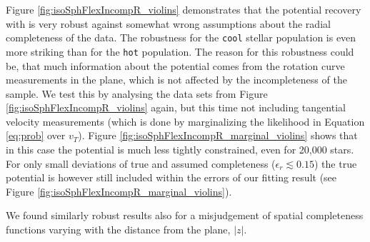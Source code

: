 Figure \ref{fig:isoSphFlexIncompR_violins} demonstrates that the potential recovery with \RM{} is very robust against somewhat wrong assumptions about the radial completeness of the data. The robustness for the \texttt{cool} stellar population is even more striking than for the \texttt{hot} population. The reason for this robustness could be, that much information about the potential comes from the rotation curve measurements in the plane, which is not affected by the incompleteness of the sample. We test this by analysing the data sets from Figure \ref{fig:isoSphFlexIncompR_violins} again, but this time not including tangential velocity measurements (which is done by marginalizing the likelihood in Equation \ref{eq:prob} over $v_T$). Figure \ref{fig:isoSphFlexIncompR_marginal_violins} shows that in this case the potential is much less tightly constrained, even for 20,000 stars. For only small deviations of true and assumed completeness ($\epsilon_r \lesssim 0.15$) the true potential is however still included within the errors of our fitting result (see Figure \ref{fig:isoSphFlexIncompR_marginal_violins}).

We found similarly robust results also for a misjudgement of spatial completeness functions varying with the distance from the plane, $|z|$.



